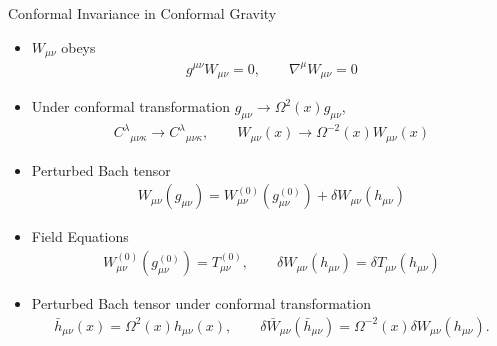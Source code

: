 \documentclass[8pt,aspectratio=1610]{beamer}
\begin{document}

\begin{frame}{Conformal Invariance in Conformal Gravity}
	\begin{itemize}
		\item $W_{\mu\nu}$ obeys
		\begin{eqnarray}
		g^{\mu\nu}W_{\mu\nu} = 0,\qquad \nabla^\mu W_{\mu\nu} = 0
		\end{eqnarray}
		\item Under conformal transformation $g_{\mu\nu} \to \Omega^2(x) g_{\mu\nu}$,
		\begin{eqnarray}
		C^\lambda{}_{\mu\nu\kappa} \to C^\lambda{}_{\mu\nu\kappa},\qquad 
		W_{\mu\nu}(x)\rightarrow \Omega^{-2}(x) W_{\mu\nu}(x)
		\end{eqnarray}
		\item Perturbed Bach tensor
		\begin{eqnarray}
		W_{\mu\nu}(g_{\mu\nu})= W^{(0)}_{\mu\nu}(g^{(0)}_{\mu\nu})+\delta W_{\mu\nu}(h_{\mu\nu})
		\end{eqnarray}
		\item Field Equations
		\begin{eqnarray}
		W^{(0)}_{\mu\nu}(g^{(0)}_{\mu\nu}) = T_{\mu\nu}^{(0)},\qquad \delta W_{\mu\nu}(h_{\mu\nu}) = \delta T_{\mu\nu}(h_{\mu\nu})
		\end{eqnarray}
		\item Perturbed Bach tensor under conformal transformation
		\begin{eqnarray}
		\bar{h}_{\mu\nu}(x)=\Omega^2(x)h_{\mu\nu}(x),\qquad \delta \bar{W}_{\mu\nu}(\bar{h}_{\mu\nu})=\Omega^{-2}(x)\delta W_{\mu\nu}(h_{\mu\nu}).
		\end{eqnarray}
	\end{itemize}
\end{frame}

\end{document}
